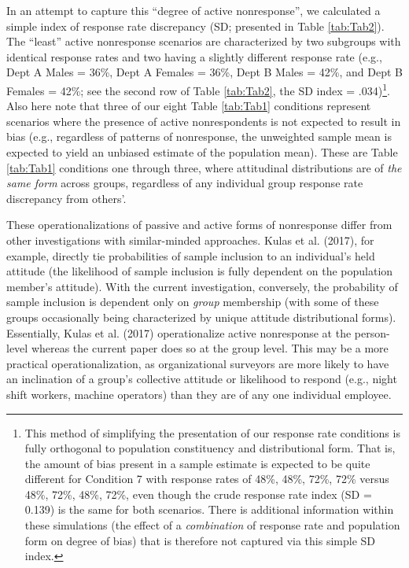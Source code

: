 \documentclass[
  ,man,floatsintext]{apa6}
\begin{document}
In an attempt to capture this ``degree of active nonresponse'', we calculated a simple index of response rate discrepancy (SD; presented in Table \ref{tab:Tab2}). The ``least'' active nonresponse scenarios are characterized by two subgroups with identical response rates and two having a slightly different response rate (e.g., Dept A Males = 36\%, Dept A Females = 36\%, Dept B Males = 42\%, and Dept B Females = 42\%; see the second row of Table \ref{tab:Tab2}, the SD index = .034)\footnote{This method of simplifying the presentation of our response rate conditions is fully orthogonal to population constituency and distributional form. That is, the amount of bias present in a sample estimate is expected to be quite different for Condition 7 with response rates of 48\%, 48\%, 72\%, 72\% versus 48\%, 72\%, 48\%, 72\%, even though the crude response rate index (SD = 0.139) is the same for both scenarios. There is additional information within these simulations (the effect of a \emph{combination} of response rate and population form on degree of bias) that is therefore not captured via this simple SD index.}. Also here note that three of our eight Table \ref{tab:Tab1} conditions represent scenarios where the presence of active nonrespondents is not expected to result in bias (e.g., regardless of patterns of nonresponse, the unweighted sample mean is expected to yield an unbiased estimate of the population mean). These are Table \ref{tab:Tab1} conditions one through three, where attitudinal distributions are of \emph{the same form} across groups, regardless of any individual group response rate discrepancy from others'.

These operationalizations of passive and active forms of nonresponse differ from other investigations with similar-minded approaches. Kulas et al. (2017), for example, directly tie probabilities of sample inclusion to an individual's held attitude (the likelihood of sample inclusion is fully dependent on the population member's attitude). With the current investigation, conversely, the probability of sample inclusion is dependent only on \emph{group} membership (with some of these groups occasionally being characterized by unique attitude distributional forms). Essentially, Kulas et al. (2017) operationalize active nonresponse at the person-level whereas the current paper does so at the group level. This may be a more practical operationalization, as organizational surveyors are more likely to have an inclination of a group's collective attitude or likelihood to respond (e.g., night shift workers, machine operators) than they are of any one individual employee.
\end{document}
